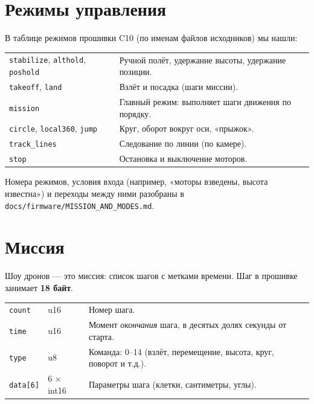 \section{Режимы управления}

В таблице режимов прошивки C10 (по именам файлов исходников) мы нашли:

\begin{tabularx}{\textwidth}{@{}l Y@{}}
\toprule
{} &  \\ \midrule
\texttt{stabilize}, \texttt{althold}, \texttt{poshold} & Ручной полёт, удержание высоты, удержание позиции. \\
\texttt{takeoff}, \texttt{land} & Взлёт и посадка (шаги миссии). \\
\texttt{mission} & Главный режим: выполняет шаги движения по порядку. \\
\texttt{circle}, \texttt{local360}, \texttt{jump} & Круг, оборот вокруг оси, «прыжок». \\
\texttt{track\_lines} & Следование по линии (по камере). \\
\texttt{stop} & Остановка и выключение моторов. \\ \bottomrule
\end{tabularx}

\vspace{4pt}
\pr{} Номера режимов, условия входа (например, «моторы взведены, высота известна») и переходы между ними разобраны в \texttt{docs/firmware/MISSION\_AND\_MODES.md}.

\section{Миссия}

Шоу дронов --- это миссия: список шагов с метками времени. Шаг в прошивке занимает \textbf{18 байт}.

\begin{tabularx}{\textwidth}{@{}l l Y@{}}
\toprule
{} &  &  \\ \midrule
\texttt{count} & u16 & Номер шага. \\
\texttt{time} & u16 & Момент \emph{окончания} шага, в десятых долях секунды от старта. \\
\texttt{type} & u8 & Команда: 0--14 (взлёт, перемещение, высота, круг, поворот и т.д.). \\
\texttt{data[6]} & 6 $\times$ int16 & Параметры шага (клетки, сантиметры, углы). \\ \bottomrule
\end{tabularx}

